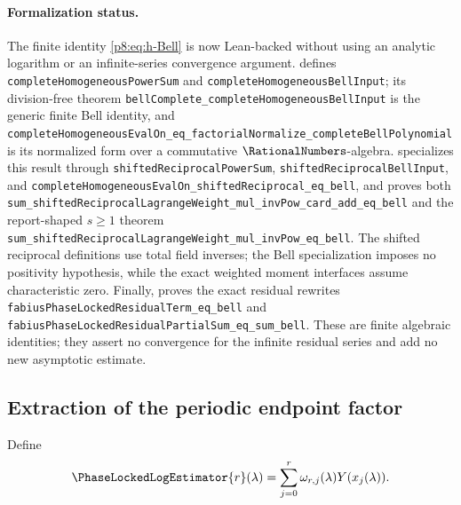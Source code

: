 \documentclass[11pt]{article}
\numberwithin{equation}{section}
\theoremstyle{definition}
\theoremstyle{remark}
\begin{document}
\paragraph{Formalization status.}
The finite identity \eqref{p8:eq:h-Bell} is now Lean-backed without using an
analytic logarithm or an infinite-series convergence argument.
 defines
\nolinkurl{completeHomogeneousPowerSum} and
\nolinkurl{completeHomogeneousBellInput}; its division-free theorem
\nolinkurl{bellComplete_completeHomogeneousBellInput} is the generic finite
Bell identity, and
\nolinkurl{completeHomogeneousEvalOn_eq_factorialNormalize_completeBellPolynomial}
is its normalized form over a commutative $\RationalNumbers$-algebra.
 specializes this result through
\nolinkurl{shiftedReciprocalPowerSum},
\nolinkurl{shiftedReciprocalBellInput}, and
\nolinkurl{completeHomogeneousEvalOn_shiftedReciprocal_eq_bell}, and proves
both
\nolinkurl{sum_shiftedReciprocalLagrangeWeight_mul_invPow_card_add_eq_bell}
and the report-shaped $s\ge1$ theorem
\nolinkurl{sum_shiftedReciprocalLagrangeWeight_mul_invPow_eq_bell}.
The shifted reciprocal definitions use total field inverses; the Bell
specialization imposes no positivity hypothesis, while the exact weighted
moment interfaces assume characteristic zero.
Finally,  proves the exact
residual rewrites
\nolinkurl{fabiusPhaseLockedResidualTerm_eq_bell} and
\nolinkurl{fabiusPhaseLockedResidualPartialSum_eq_sum_bell}.  These are
finite algebraic identities; they assert no convergence for the infinite
residual series and add no new asymptotic estimate.

\subsection{Extraction of the periodic endpoint factor}

Define
\begin{equation}
\PhaseLockedLogEstimator{r}(\lambda)
=\sum_{j=0}^{r}\omega_{r,j}(\lambda)Y(x_j(\lambda)).
\label{p8:eq:Psi-hat}
\end{equation}
\end{document}
